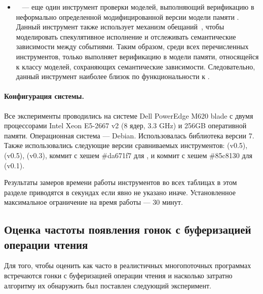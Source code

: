 \begin{itemize}
  \item \CDSChecker~\cite{Norris-Demsky:OOPSLA2013} --- 
    еще один инструмент проверки моделей, выполняющий верификацию 
    в неформально определенной модифицированной версии модели памяти \CMM.
    Данный инструмент также использует механизм обещаний~\cite{Kang-al:POPL17}, 
    чтобы моделировать спекулятивное исполнение и отслеживать
    семантические зависимости между событиями. 
    Таким образом, среди всех перечисленных инструментов,
    только \CDSChecker выполняет верификацию в модели памяти, 
    относящейся к классу моделей, сохраняющих семантические зависимости. 
    Следовательно, данный инструмент наиболее близок по функциональности к \wmc.

\end{itemize}

\paragraph{Конфигурация системы.} 

Все эксперименты проводились на системе Dell PowerEdge M620 blade
с двумя процессорами Intel Xeon E5-2667 v2 (8 ядер, 3.3 GHz)
и 256GB оперативной памяти. Операционная система --- Debian.
Использовалась библиотека \LLVM версии 7.
Также использовались следующие версии сравниваемых инструментов: 
\hmc (v0.5), \genmc (v0.5), \Nidhugg (v0.3), 
коммит с хешем \#da671f7 для \CDSChecker,
и коммит с хешем \#85c8130 для \rmem (v0.1). 

Результаты замеров времени работы инструментов 
во всех таблицах в этом разделе приводятся 
в секундах если явно не указано иначе. 
Установленное максимальное ограничение на время работы --- 30 минут.

\subsection*{Оценка частоты появления гонок с буферизацией операции чтения}

Для того, чтобы оценить как часто в реалистичных многопоточных
программах встречаются гонки с буферизацией операции чтения
и насколько затратно алгоритму \wmc их обнаружить 
был поставлен следующий эксперимент.



